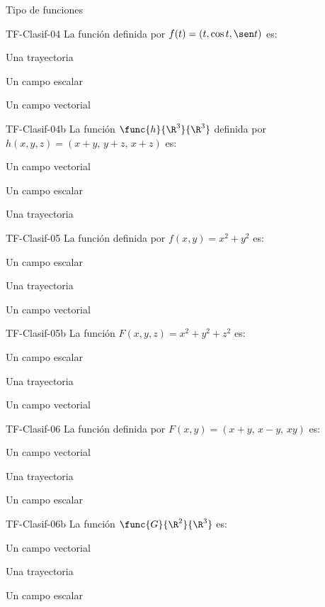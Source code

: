 \documentclass[a4,11pt]{aleph-notas}
\begin{document}
\begin{quiz}{Tipo de funciones}
\begin{multi}[]%
    {TF-Clasif-04}
    La función definida por $f(t)=(t, \cos t, \sen t)$ es:
    \item* Una trayectoria
    \item Un campo escalar
    \item Un campo vectorial
\end{multi}

\begin{multi}[]%
    {TF-Clasif-04b}
    La función $\func{h}{\R^3}{\R^3}$ definida por $h(x,y,z)=(x+y,\, y+z,\, x+z)$ es:
    \item* Un campo vectorial
    \item Un campo escalar
    \item Una trayectoria
\end{multi}

\begin{multi}[]%
    {TF-Clasif-05}
    La función definida por $f(x,y)=x^2+y^2$ es:
    \item* Un campo escalar
    \item Una trayectoria
    \item Un campo vectorial
\end{multi}

\begin{multi}[]%
    {TF-Clasif-05b}
    La función $F(x,y,z)=x^2+y^2+z^2$ es:
    \item* Un campo escalar
    \item Una trayectoria
    \item Un campo vectorial
\end{multi}

\begin{multi}[]%
    {TF-Clasif-06}
    La función definida por $F(x,y)=(x+y,\, x-y,\, xy)$ es:
    \item* Un campo vectorial
    \item Una trayectoria
    \item Un campo escalar
\end{multi}

\begin{multi}[]%
    {TF-Clasif-06b}
    La función $\func{G}{\R^2}{\R^3}$ es:
    \item* Un campo vectorial
    \item Una trayectoria
    \item Un campo escalar
\end{multi}

\end{quiz}
\end{document}
